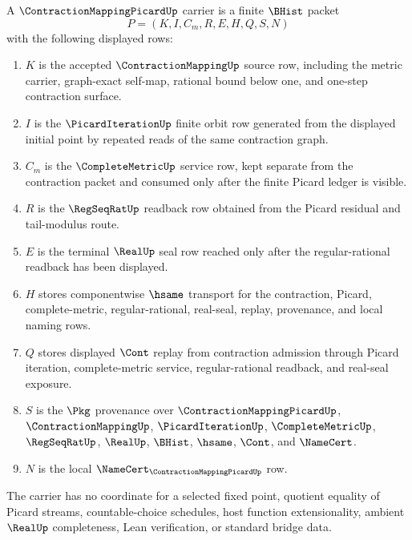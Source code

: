 \begin{definition}
\label{def:contraction-mapping-picard-carrier}
A $\ContractionMappingPicardUp$ carrier is a finite $\BHist$ packet
$$
P=(K,I,C_m,R,E,H,Q,S,N)
$$
with the following displayed rows:
\begin{enumerate}
\item $K$ is the accepted $\ContractionMappingUp$ source row, including the metric carrier, graph-exact self-map, rational bound below one, and one-step contraction surface.
\item $I$ is the $\PicardIterationUp$ finite orbit row generated from the displayed initial point by repeated reads of the same contraction graph.
\item $C_m$ is the $\CompleteMetricUp$ service row, kept separate from the contraction packet and consumed only after the finite Picard ledger is visible.
\item $R$ is the $\RegSeqRatUp$ readback row obtained from the Picard residual and tail-modulus route.
\item $E$ is the terminal $\RealUp$ seal row reached only after the regular-rational readback has been displayed.
\item $H$ stores componentwise $\hsame$ transport for the contraction, Picard, complete-metric, regular-rational, real-seal, replay, provenance, and local naming rows.
\item $Q$ stores displayed $\Cont$ replay from contraction admission through Picard iteration, complete-metric service, regular-rational readback, and real-seal exposure.
\item $S$ is the $\Pkg$ provenance over $\ContractionMappingPicardUp$, $\ContractionMappingUp$, $\PicardIterationUp$, $\CompleteMetricUp$, $\RegSeqRatUp$, $\RealUp$, $\BHist$, $\hsame$, $\Cont$, and $\NameCert$.
\item $N$ is the local $\NameCert_{\ContractionMappingPicardUp}$ row.
\end{enumerate}
The carrier has no coordinate for a selected fixed point, quotient equality of Picard streams, countable-choice schedules, host function extensionality, ambient $\RealUp$ completeness, Lean verification, or standard bridge data.
\end{definition}

